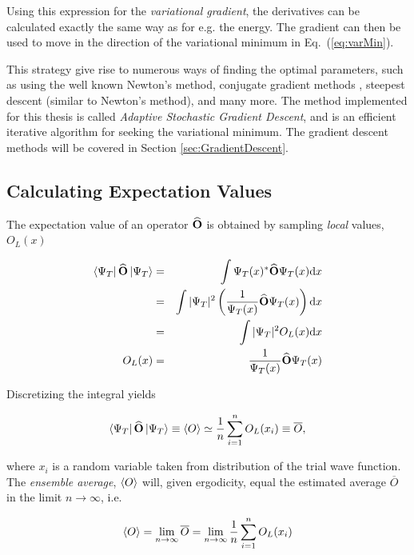 Using this expression for the \textit{variational gradient}, the derivatives can be calculated exactly the same way as for e.g. the energy. The gradient can then be used to move in the direction of the variational minimum in Eq.~(\ref{eq:varMin}). 

This strategy give rise to numerous ways of finding the optimal parameters, such as using the well known Newton's method, conjugate gradient methods \cite{golub1996matrix}, steepest descent (similar to Newton's method), and many more. 
The method implemented for this thesis is called \textit{Adaptive Stochastic Gradient Descent}, and is an efficient iterative algorithm for seeking the variational minimum. The gradient descent methods will be covered in Section \ref{sec:GradientDescent}.

\subsection{Calculating Expectation Values}
\label{sec:calcExpVals}

The expectation value of an operator ${\bf\widehat{O}}$ is obtained by sampling \textit{local} values, $O_L(x)$

\begin{eqnarray}
 \left< \Psi_T \right|{\bf\widehat{O}}\left| \Psi_T \right> &=& \int \Psi_T(x)^\ast {\bf\widehat{O}} \Psi_T(x)\mathrm{d}x \nonumber\\
                                &=& \int |\Psi_T|^2\left(\frac{1}{\Psi_T(x)}{\bf\widehat{O}}\Psi_T(x)\right)\mathrm{d}x \nonumber\\
                                &=& \int |\Psi_T|^2 O_L(x)\mathrm{d}x \\
                         O_L(x) &=& \frac{1}{\Psi_T(x)}{\bf\widehat{O}}\Psi_T(x)           
\end{eqnarray}

Discretizing the integral yields 

\begin{equation}
 \left< \Psi_T \right|{\bf\widehat{O}}\left| \Psi_T \right> \equiv \left< O \right> \simeq \frac{1}{n}\sum_{i=1}^n O_L(x_i) \equiv \overline{O},
\end{equation}

where $x_i$ is a random variable taken from distribution of the trial wave function. The \textit{ensemble average},  $\left< O \right>$ will, given ergodicity, equal the estimated average $\overline{O}$ in the limit $n\rightarrow\infty$, i.e.

\begin{equation}
 \label{eq:MeanVStrueExp}
 \left< O \right> = \lim_{n\to\infty} \overline{O} = \lim_{n\to\infty}\frac{1}{n}\sum_{i=1}^n O_L(x_i)
\end{equation}


